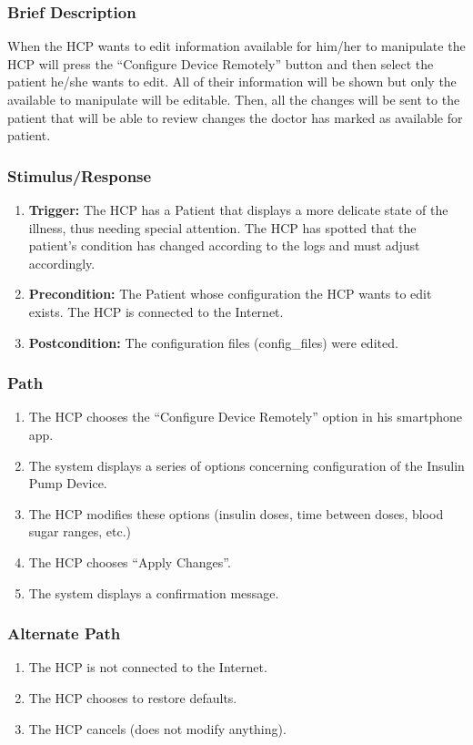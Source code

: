 \documentclass{scrreprt}
\begin{document}
    \subsubsection{Brief Description}
        When the HCP wants to edit information available for him/her to manipulate the HCP will press the “Configure Device Remotely” button and then select the patient he/she wants to edit. All of their information will 
        be shown but only the available to manipulate will be editable. Then, all the changes will be sent to the patient that will be able to review changes the doctor has marked as available for patient.
    \subsubsection{Stimulus/Response}
    \begin{enumerate}
        \item \textbf{Trigger:} The HCP has a Patient that displays a more delicate state of the illness, thus needing special attention. The HCP has spotted that the patient's condition has changed according to the logs
            and must adjust accordingly.
        \item \textbf{Precondition:} The Patient whose configuration the HCP wants to edit exists. The HCP is connected to the Internet.
        \item \textbf{Postcondition:} The configuration files (config\_files) were edited.
    \end{enumerate}
    \subsubsection{Path}
    \begin{enumerate}
        \item The HCP chooses the “Configure Device Remotely” option in his smartphone app. 
        \item The system displays a series of options concerning configuration of the Insulin Pump Device.
        \item The HCP modifies these options (insulin doses, time between doses, blood sugar ranges, etc.)
        \item The HCP chooses “Apply Changes”.
        \item The system displays a confirmation message.
    \end{enumerate}
    \subsubsection{Alternate Path}
    \begin{enumerate}
        \item The HCP is not connected to the Internet.
        \item The HCP chooses to restore defaults.
        \item The HCP cancels (does not modify anything).
    \end{enumerate}
\end{document}
